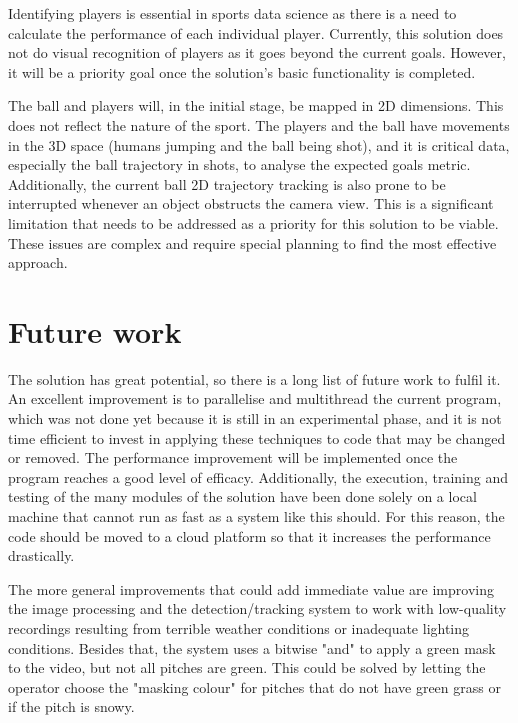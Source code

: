 \documentclass[
    11pt,
    oneside
]{report}
\begin{document}
Identifying players is essential in sports data science as there is a need to calculate the performance of each individual player. Currently, this solution does not do visual recognition of players as it goes beyond the current goals. However, it will be a priority goal once the solution's basic functionality is completed.


The ball and players will, in the initial stage, be mapped in 2D dimensions. This does not reflect the nature of the sport. The players and the ball have movements in the 3D space (humans jumping and the ball being shot), and it is critical data, especially the ball trajectory in shots, to analyse the expected goals metric. Additionally, the current ball 2D trajectory tracking is also prone to be interrupted whenever an object obstructs the camera view. This is a significant limitation that needs to be addressed as a priority for this solution to be viable. These issues are complex and require special planning to find the most effective approach.




\section{Future work}




The solution has great potential, so there is a long list of future work to fulfil it. An excellent improvement is to parallelise and multithread the current program, which was not done yet because it is still in an experimental phase, and it is not time efficient to invest in applying these techniques to code that may be changed or removed. The performance improvement will be implemented once the program reaches a good level of efficacy. Additionally, the execution, training and testing of the many modules of the solution have been done solely on a local machine that cannot run as fast as a system like this should. For this reason, the code should be moved to a cloud platform so that it increases the performance drastically.


The more general improvements that could add immediate value are improving the image processing and the detection/tracking system to work with low-quality recordings resulting from terrible weather conditions or inadequate lighting conditions. Besides that, the system uses a bitwise "and" to apply a green mask to the video, but not all pitches are green. This could be solved by letting the operator choose the "masking colour" for pitches that do not have green grass or if the pitch is snowy.
\end{document}
